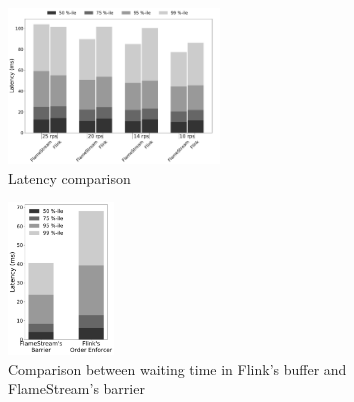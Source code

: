 \begin{figure}[htbp]
  \centering
  \includegraphics[width=0.5\textwidth]{pics/comp-index-quantiles}
  \caption{Latency comparison}
  \label {fs-index-quantiles}
\end{figure}

\begin{figure}[htbp]
  \centering
  \includegraphics[width=0.25\textwidth]{pics/buffer-vs-barrier}
  \caption{Comparison between waiting time in Flink's buffer and FlameStream's barrier}
  \label {buffer-vs-barrier}
\end{figure}
